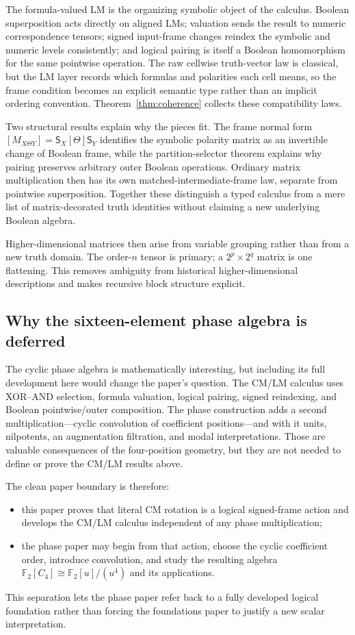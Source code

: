 \documentclass[11pt]{article}
\theoremstyle{definition}
\theoremstyle{remark}
\newcommand{\F}{\mathbb F}
\begin{document}
The formula-valued LM is the organizing symbolic object of the calculus.  Boolean superposition acts directly on aligned LMs; valuation sends the result to numeric correspondence tensors; signed input-frame changes reindex the symbolic and numeric levels consistently; and logical pairing is itself a Boolean homomorphism for the same pointwise operation.  The raw cellwise truth-vector law is classical, but the LM layer records which formulas and polarities each cell means, so the frame condition becomes an explicit semantic type rather than an implicit ordering convention.  Theorem~\ref{thm:coherence} collects these compatibility laws.

Two structural results explain why the pieces fit.  The frame normal form $[M_{X\Theta Y}]=\mathsf S_X[\Theta]\mathsf S_Y$ identifies the symbolic polarity matrix as an invertible change of Boolean frame, while the partition-selector theorem explains why pairing preserves arbitrary outer Boolean operations.  Ordinary matrix multiplication then has its own matched-intermediate-frame law, separate from pointwise superposition.  Together these distinguish a typed calculus from a mere list of matrix-decorated truth identities without claiming a new underlying Boolean algebra.

Higher-dimensional matrices then arise from variable grouping rather than from a new truth domain.  The order-$n$ tensor is primary; a $2^p\times2^q$ matrix is one flattening.  This removes ambiguity from historical higher-dimensional descriptions and makes recursive block structure explicit.

\subsection{Why the sixteen-element phase algebra is deferred}

The cyclic phase algebra is mathematically interesting, but including its full development here would change the paper's question.  The CM/LM calculus uses XOR--AND selection, formula valuation, logical pairing, signed reindexing, and Boolean pointwise/outer composition.  The phase construction adds a second multiplication---cyclic convolution of coefficient positions---and with it units, nilpotents, an augmentation filtration, and modal interpretations.  Those are valuable consequences of the four-position geometry, but they are not needed to define or prove the CM/LM results above.

The clean paper boundary is therefore:
\begin{itemize}
  \item this paper proves that literal CM rotation is a logical signed-frame action and develops the CM/LM calculus independent of any phase multiplication;
  \item the phase paper may begin from that action, choose the cyclic coefficient order, introduce convolution, and study the resulting algebra $\F_2[C_4]\cong\F_2[u]/(u^4)$ and its applications.
\end{itemize}
This separation lets the phase paper refer back to a fully developed logical foundation rather than forcing the foundations paper to justify a new scalar interpretation.
\end{document}
